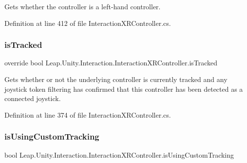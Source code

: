 Gets whether the controller is a left-\/hand controller. 



Definition at line 412 of file Interaction\+X\+R\+Controller.\+cs.

\mbox{\label{class_leap_1_1_unity_1_1_interaction_1_1_interaction_x_r_controller_ab5d50597383ad3e552e3c16d1e91e5a7}} 
\subsubsection{\texorpdfstring{isTracked}{isTracked}}
{\footnotesize\ttfamily override bool Leap.\+Unity.\+Interaction.\+Interaction\+X\+R\+Controller.\+is\+Tracked\hspace{0.3cm}{\ttfamily [get]}}



Gets whether or not the underlying controller is currently tracked and any joystick token filtering has confirmed that this controller has been detected as a connected joystick. 



Definition at line 374 of file Interaction\+X\+R\+Controller.\+cs.

\mbox{\label{class_leap_1_1_unity_1_1_interaction_1_1_interaction_x_r_controller_a621446c06cfa8391f7f0d8990d885bf5}} 
\subsubsection{\texorpdfstring{isUsingCustomTracking}{isUsingCustomTracking}}
{\footnotesize\ttfamily bool Leap.\+Unity.\+Interaction.\+Interaction\+X\+R\+Controller.\+is\+Using\+Custom\+Tracking\hspace{0.3cm}{\ttfamily [get]}}



